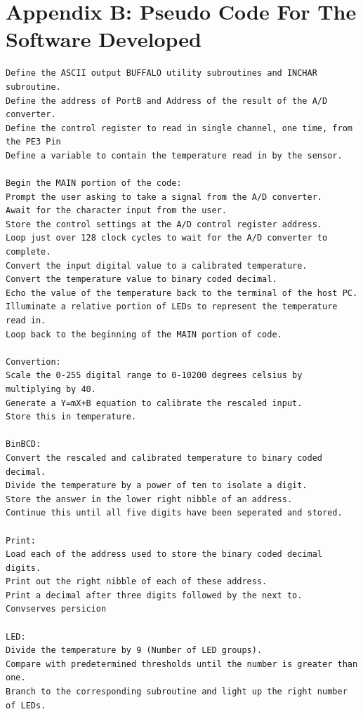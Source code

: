 \documentclass[12pt]{report}
\begin{document}
\section*{Appendix B: Pseudo Code For The Software Developed}
	\begin{Verbatim}[frame=single, fontsize=\small]
Define the ASCII output BUFFALO utility subroutines and INCHAR subroutine.
Define the address of PortB and Address of the result of the A/D converter.
Define the control register to read in single channel, one time, from the PE3 Pin
Define a variable to contain the temperature read in by the sensor.
		
Begin the MAIN portion of the code:
Prompt the user asking to take a signal from the A/D converter.
Await for the character input from the user.
Store the control settings at the A/D control register address.
Loop just over 128 clock cycles to wait for the A/D converter to complete.
Convert the input digital value to a calibrated temperature.
Convert the temperature value to binary coded decimal.
Echo the value of the temperature back to the terminal of the host PC.
Illuminate a relative portion of LEDs to represent the temperature read in.
Loop back to the beginning of the MAIN portion of code.
		
Convertion:
Scale the 0-255 digital range to 0-10200 degrees celsius by multiplying by 40.
Generate a Y=mX+B equation to calibrate the rescaled input.
Store this in temperature.
		
BinBCD:
Convert the rescaled and calibrated temperature to binary coded decimal.
Divide the temperature by a power of ten to isolate a digit.
Store the answer in the lower right nibble of an address.
Continue this until all five digits have been seperated and stored.
		
Print:
Load each of the address used to store the binary coded decimal digits.
Print out the right nibble of each of these address.
Print a decimal after three digits followed by the next to.  Convserves persicion
		
LED:
Divide the temperature by 9 (Number of LED groups).
Compare with predetermined thresholds until the number is greater than one.
Branch to the corresponding subroutine and light up the right number of LEDs.
	\end{Verbatim}
\end{document}
